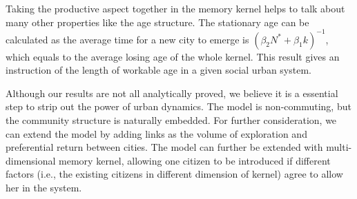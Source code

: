 \documentclass[reprint,unsortedaddress,amsmath,amssymb,aps,prl,showkeys]{revtex4-2}
\begin{document}
Taking the productive aspect together in the memory kernel helps to talk about many other properties like the age structure. The stationary age can be calculated as the average time for a new city to emerge is $(\beta_2 N^* + \beta_1 k)^{-1}$, which equals to the average losing age of the whole kernel. This result gives an instruction of the length of workable age in a given social urban system.

Although our results are not all analytically proved, we believe it is a essential step to strip out the power of urban dynamics. The model is non-commuting, but the community structure is naturally embedded. For further consideration, we can extend the model by adding links as the volume of exploration and preferential return between cities\cite{WANG2019121921}. The model can further be extended with multi-dimensional memory kernel, allowing one citizen to be introduced if different factors (i.e., the existing citizens in different dimension of kernel) agree to allow her in the system.




\end{document}

